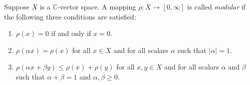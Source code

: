 \documentclass[12pt]{article}
\begin{document}
Suppose $X$ is a $\mathbb{C}$-vector space. A mapping $\rho:X\to [0,\infty]$ is called \textit{modular} if the following three conditions are satisfied:
\begin{enumerate}
\item $\rho(x) = 0$ if and only if $x=0$.
\item $\rho(\alpha x) = \rho(x)$ for all $x \in X$ and for all scalars $\alpha$ such that $|\alpha|=1$.
\item $\rho(\alpha x + \beta y) \leq \rho(x) + \rho(y)$ for all $x,y \in X$ and for all scalars $\alpha$ and $\beta$ such that $\alpha + \beta =1$ and $\alpha ,\beta \geq 0$.
\end{enumerate}


\end{document}
